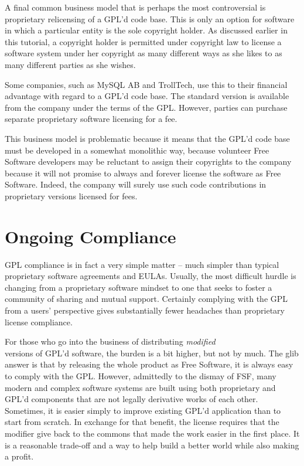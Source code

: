 \documentclass[11pt, letterpaper]{book}
\begin{document}
\medskip

\label{Proprietary Relicensing}

A final common business model that is perhaps the most controversial is
proprietary relicensing of a GPL'd code base. This is only an option for
software in which a particular entity is the sole copyright holder. As
discussed earlier in this tutorial, a copyright holder is permitted under
copyright law to license a software system under her copyright as many
different ways as she likes to as many different parties as she wishes.

Some companies, such as MySQL AB and TrollTech, use this to their
financial advantage with regard to a GPL'd code base. The standard
version is available from the company under the terms of the GPL\@.
However, parties can purchase separate proprietary software licensing for
a fee.

This business model is problematic because it means that the GPL'd code
base must be developed in a somewhat monolithic way, because volunteer
Free Software developers may be reluctant to assign their copyrights to
the company because it will not promise to always and forever license the
software as Free Software. Indeed, the company will surely use such code
contributions in proprietary versions licensed for fees.

\section{Ongoing Compliance}

GPL compliance is in fact a very simple matter -- much simpler than
typical proprietary software agreements and EULAs. Usually, the most
difficult hurdle is changing from a proprietary software mindset to one
that seeks to foster a community of sharing and mutual support. Certainly
complying with the GPL from a users' perspective gives substantially fewer
headaches than proprietary license compliance.

For those who go into the business of distributing {\em modified\\}
versions of GPL'd software, the burden is a bit higher, but not by
much. The glib answer is that by releasing the whole product as Free
Software, it is always easy to comply with the GPL. However,
admittedly to the dismay of FSF, many modern and complex software
systems are built using both proprietary and GPL'd components that are
not legally derivative works of each other. Sometimes, it is easier simply to
improve existing GPL'd application than to start from scratch. In
exchange for that benefit, the license requires that the modifier give
back to the commons that made the work easier in the first place. It is a
reasonable trade-off and a way to help build a better world while also
making a profit.
\end{document}
